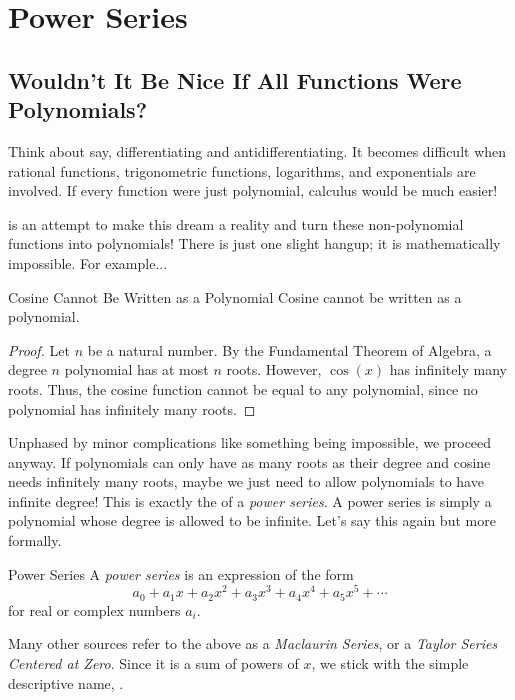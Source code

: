 \chapter{Power Series}\label{PowerSeries}

\section{Wouldn't It Be Nice If All Functions Were Polynomials?}  Think about say, differentiating and antidifferentiating.  It becomes difficult when rational functions, trigonometric functions, logarithms, and exponentials are involved.  If every function were just polynomial, calculus would be much easier!

 is an attempt to make this dream a reality and turn these non-polynomial functions into polynomials!  There is just one slight hangup; it is mathematically impossible.  For example...

\begin{theorem}{Cosine Cannot Be Written as a Polynomial}
Cosine cannot be written as a polynomial.
\end{theorem}
\vspace{-.1in}
\begin{proof} Let $n$ be a natural number.  By the Fundamental Theorem of Algebra, a degree $n$ polynomial has at most $n$ roots.  However, $\cos(x)$ has infinitely many roots.  Thus, the cosine function cannot be equal to any polynomial, since no polynomial has infinitely many roots.
\end{proof}

Unphased by minor complications like something being impossible, we proceed anyway.  If polynomials can only have as many roots as their degree and cosine needs infinitely many roots, maybe we just need to allow polynomials to have infinite degree!  This is exactly the  of a \emph{power series}.  A power series is simply a polynomial whose degree is allowed to be infinite.  Let's say this again but more formally.

\begin{definition}{Power Series}
A \emph{power series} is an expression of the form $$a_0+a_1x+a_2x^2+a_3x^3+a_4x^4+a_5x^5+\cdots $$ for real or complex numbers $a_i$.
\end{definition}

Many other sources refer to the above as a \emph{Maclaurin Series}, or a \emph{Taylor Series Centered at Zero}.  Since it is a sum of powers of $x$, we stick with the simple descriptive name, .


